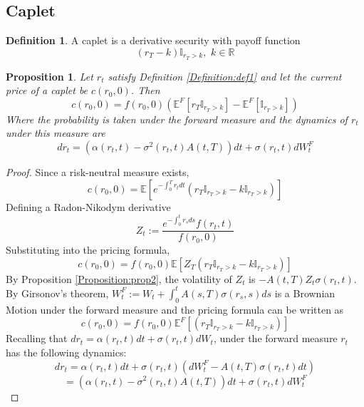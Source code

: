 \documentclass[12pt]{article}
\newtheorem{bond}{Proposition}
\theoremstyle{definition}
\newtheorem{mydef}{Definition}
\theoremstyle{remark}
\begin{document}
\subsection{Caplet}
\begin{mydef}
A caplet is a derivative security with payoff function
\[(r_T-k)\mathbb{I}_{r_T > k},\,\,k \in \mathbb{R} \]
\label{Definition:def2}
\end{mydef}
\begin{bond}
Let \(r_t\) satisfy Definition \ref{Definition:def1} and let the current price of a caplet be \(c(r_0, 0)\). Then
\begin{equation}c(r_0, 0)=f(r_0, 0)\left(\mathbb{E}^{F} \left[r_T\mathbb{I}_{r_T >k} \right] -\mathbb{E}^{F} \left[\mathbb{I}_{r_T >k}\right]\right) \label{Equation:eq1}\end{equation} 
Where the probability is taken under the forward measure and the dynamics of \(r_t\) under this measure are
\begin{equation}dr_t=\left(\alpha(r_t, t)-\sigma^2 (r_t, t)A(t, T)\right)dt+
\sigma(r_t, t) dW_t^F \label{Equation:eq2}\end{equation}
\label{Proposition:prop3}
\end{bond}
\begin{proof}
Since a risk-neutral measure exists, 
\[c(r_0, 0)=\mathbb{E}\left[e^{-\int_0 ^ T r_t dt} \left(r_T\mathbb{I}_{r_T >k} -k\mathbb{I}_{r_T >k} \right) \right] \]
Defining a Radon-Nikodym derivative
\[Z_t:=\frac{e^{-\int_0 ^ t r_s ds} f(r_t, t)}{f(r_0, 0)}\]
Substituting into the pricing formula, 
\[c(r_0, 0)=f(r_0, 0)\mathbb{E}\left[Z_T \left(r_T\mathbb{I}_{r_T >k} -k \mathbb{I}_{r_T >k} \right) \right] \]
By Proposition \ref{Proposition:prop2}, the volatility of \(Z_t\) is \(-A(t, T) Z_t\sigma(r_t, t)\).
By Girsonov's theorem, 
\(W_t^F := W_t +  \int_0 ^ t A(s, T) \sigma(r_s, s) ds \)
is a Brownian Motion under the forward measure and the pricing formula can be written as 
\[c(r_0, 0)=f(r_0, 0)\mathbb{E}^F\left[\left(r_T\mathbb{I}_{r_T >k} -k\mathbb{I}_{r_T >k} \right)\right] \]
Recalling that \(dr_t=\alpha(r_t, t)dt+\sigma(r_t, t)dW_t \), under the forward measure \(r_t\) has the following dynamics:
\[dr_t=\alpha(r_t, t)dt+\sigma(r_t, t)(dW_t ^F - A(t, T)\sigma(r_t, t) dt) \]
\[=\left(\alpha(r_t, t)-\sigma^2 (r_t, t)A(t, T)\right)dt+
\sigma(r_t, t) dW_t^F \]
\end{proof}
\end{document}
